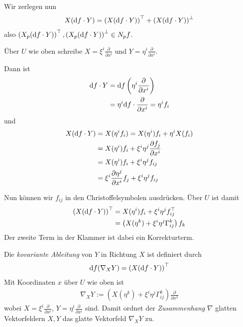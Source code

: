 \documentclass{skript}
\begin{document}
Wir zerlegen nun
\begin{align*}
  X(\mathrm d f\cdot Y) = \left( X(\mathrm d f\cdot Y) \right)^\top + \left( X(\mathrm d f \cdot Y)
  \right)^\perp
\end{align*}
also $\left( X_p(\mathrm d f\cdot Y) \right)^\top, \left( X_p(\mathrm d f\cdot Y)
\right)^\perp\in N_pf$.

Über $U$ wie oben schreibe $X = \xi^i\frac{\partial}{\partial x^i}$ und $Y =
\eta^i\frac{\partial}{\partial x^i}$.

Dann ist 
\begin{align*}
  \mathrm d f\cdot Y &= \mathrm d f\left( \eta^i\frac{\partial}{\partial x^i} \right) \\
  &= \eta^i\mathrm d f\cdot\frac{\partial}{\partial x^i} = \eta^if_i
\end{align*}
und
\begin{align*}
  X(\mathrm d f\cdot Y) &= X(\eta^if_i) = X(\eta^i)f_i + \eta^iX(f_i) \\
  &= X(\eta^i)f_i + \xi^i\eta^j\frac{\partial f_j}{\partial x^i} \\
  &= X(\eta^i)f_i + \xi^i\eta^jf_{ij} \\
  &= \xi^i\frac{\partial\eta^j}{\partial x^i}f_j + \xi^i\eta^jf_{ij}
\end{align*}

Nun können wir $f_{ij}$ in den Christoffelsymbolen ausdrücken. Über $U$ ist
damit
\begin{align*}
  \left(X(\mathrm d f\cdot Y)\right)^\top &= X(\eta^i)f_i + \xi^i\eta^jf_{ij}^\top \\
  &= \left( X(\eta^k) + \xi^i\eta^j\Gamma^k_{ij} \right)f_k
\end{align*}
Der zweite Term in der Klammer ist dabei ein Korrekturterm.

\begin{dfn}
  Die \emph{kovariante Ableitung} von $Y$ in Richtung $X$ ist definiert durch
  \begin{align*}
    \mathrm d f(\nabla_XY) = \left( X(\mathrm d f\cdot Y) \right)^\top
  \end{align*}
  Mit Koordinaten $x$ über $U$ wie oben ist
  \begin{align*}
    \nabla_XY := \left( X(\eta^k) + \xi^i\eta^j\Gamma^k_{ij}
    \right)\frac{\partial}{\partial x^2}
  \end{align*}
  wobei $X = \xi^i\frac{\partial}{\partial x^i}$, $Y =
  \eta^i\frac{\partial}{\partial x^i}$ sind. Damit ordnet der
  \emph{Zusammenhang} $\nabla$ glatten Vektorfeldern $X, Y$ das glatte
  Vektorfeld $\nabla_XY$ zu.
\end{dfn}
\end{document}

